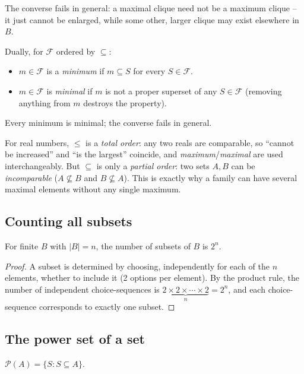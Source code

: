 \begin{note}
The converse fails in general: a maximal clique need not be a maximum clique -- it just cannot be enlarged, while some other, larger clique may exist elsewhere in $B$.
\end{note}

\begin{definition}
Dually, for $\mathcal{F}$ ordered by $\subseteq$:
\begin{itemize}
    \item $m \in \mathcal{F}$ is a \emph{minimum} if $m \subseteq S$ for every $S \in \mathcal{F}$.
    \item $m \in \mathcal{F}$ is \emph{minimal} if $m$ is not a proper superset of any $S \in \mathcal{F}$ (removing anything from $m$ destroys the property).
\end{itemize}
Every minimum is minimal; the converse fails in general.
\end{definition}

\begin{note}
For real numbers, $\le$ is a \emph{total order}: any two reals are comparable, so ``cannot be increased'' and ``is the largest'' coincide, and \emph{maximum}/\emph{maximal} are used interchangeably. But $\subseteq$ is only a \emph{partial order}: two sets $A,B$ can be \emph{incomparable} ($A \not\subseteq B$ and $B \not\subseteq A$). This is exactly why a family can have several maximal elements without any single maximum.
\end{note}

\subsection{Counting all subsets}
\label{sec:1-8}

\begin{theorem}
For finite $B$ with $|B| = n$, the number of subsets of $B$ is $2^n$.
\end{theorem}
\begin{proof}
A subset is determined by choosing, independently for each of the $n$ elements, whether to include it (2 options per element). By the product rule, the number of independent choice-sequences is $\underbrace{2 \times 2 \times \cdots \times 2}_{n} = 2^n$, and each choice-sequence corresponds to exactly one subset.
\end{proof}

\subsection{The power set of a set}
\label{sec:1-9}
\begin{definition}
$\mathcal{P}(A) = \{S : S \subseteq A\}$.
\end{definition}

